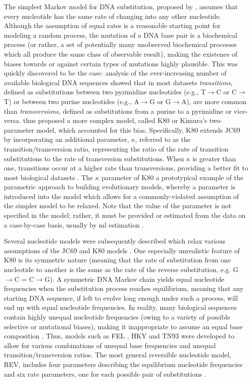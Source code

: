 The simplest Markov model for DNA substitution, proposed by
\citet{Jukes1969a}, assumes that every nucleotide has the same rate of
changing into any other nucleotide. Although the assumption of equal
rates is a reasonable starting point for modeling a random process,
the mutation of a DNA base pair is a biochemical process (or rather, a
set of potentially many unobserved biochemical processes which all
produce the same class of observable result), making the existence of
biases towards or against certain types of mutations highly
plausible. This was quickly discovered to be the case: analysis of the
ever-increasing number of available biological DNA sequences showed
that in most datasets \emph{transitions}, defined as substitutions
between two pyrimidine nucleotides (e.g., T$\to$C or C$\to$T) or
between two purine nucleotides (e.g., A$\to$G or G$\to$A), are more
common than \emph{transversions}, defined as substitutions from a
purine to a pyrimidine or vice-versa. \citet{Kimura1980} thus proposed
a more complex model, called K80 or Kimura's two-parameter model,
which accounted for this bias. Specifically, K80 extends JC69 by
incorporating an additional parameter, $\kappa$, referred to as the
transition/transversion ratio, representing the ratio of the rate of
transition substitutions to the rate of transversion
substitutions. When $\kappa$ is greater than one, transitions occur at
a higher rate than transversions, providing a better fit to most
biological datasets \citep{Brown1982}. The $\kappa$ parameter of K80 a
prototypical example of the parametric approach to building
evolutionary models, whereby a parameter is introduced into the model
which allows for a commonly-violated assumption of the simpler model
to be relaxed. Note that the value of the parameter is not specified
in the model; rather, it must be provided or estimated from the data
on a case-by-case basis, usually by \ac{ml} estimation
\citep{Whelan2001}.

Several nucleotide models were subsequently described which relax
various assumptions of the JC69 and K80 models
\citep{Whelan2001,Yang2006}. One especially unrealistic feature of K80
is its symmetric nature (meaning that the rate of substitution from
one nucleotide to another is the same as the rate of the reverse
substitution, e.g. G$\to$C = C$\to$G). A symmetric DNA Markov chain
yields equal nucleotide frequencies when the substitution process
reaches equilibrium, meaning that any starting DNA sequence, if left
to evolve long enough under such a process, will end up with equal
nucleotide frequencies. In reality, many biological sequences contain
highly unequal nucleotide frequencies (owing to a variety of possible
selective or mutational biases), making it inappropriate to assume an
equal base composition \citep{Yang2006}. Thus, models such as FEL
\citep{Felsenstein1981a}, HKY \citep{Hasegawa1985} and TN93
\citep{Tamura1993} were developed to allow for various combinations of
unequal base frequencies and unequal transition/transversion
ratios. The most general reversible nucleotide model, REV, includes four
parameters describing the equilibrium nucleotide frequencies and six
rate parameters, one for each possible pair of substitutions
\citep{Tavare1986}.

